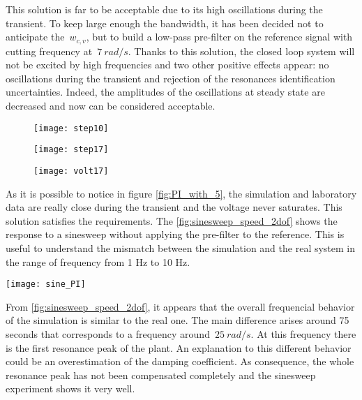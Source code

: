 This solution is far to be acceptable due to its high oscillations during the transient. To keep large enough the bandwidth, it has been decided not to anticipate the~$w_{c,v}$, but to build a low-pass pre-filter on the reference signal with cutting frequency at~$7\ rad/s$. Thanks to this solution, the closed loop system will not be excited by high frequencies and two other positive effects appear: no oscillations during the transient and rejection of the resonances identification uncertainties. Indeed, the amplitudes of the oscillations at steady state are decreased and now can be considered acceptable. 

\newpage
\begin{figure*}[h]
	\centering
\begin{subfigure}{0.4\columnwidth}
	\texttt{[image: step10]}
\end{subfigure}
\begin{subfigure}{0.4\columnwidth}
	\texttt{[image: step17]}
\end{subfigure}
\begin{subfigure}{0.4\columnwidth}
	\texttt{[image: volt17]}
\end{subfigure}
\caption{Speed control loop with $k_v=5$ with low-pass pre-filter}
\label{fig:PI_with_5}
\end{figure*}

As it is possible to notice in figure \ref{fig:PI_with_5}, the simulation and laboratory data are really close during the transient and the voltage never saturates. This solution satisfies the requirements. The \cref{fig:sinesweep_speed_2dof} shows the response to a sinesweep without applying the pre-filter to the reference.  This is useful to understand the mismatch between the simulation and the real system in the range of frequency from 1 Hz to 10 Hz.

\begin{figure*}[h]
	\centering
	\texttt{[image: sine\_PI]}
	\caption{Sineweep experiment from $1\ Hz$ to $10\ Hz$ in $100\ s$}
	\label{fig:sinesweep_speed_2dof}
\end{figure*}

From \cref{fig:sinesweep_speed_2dof}, it appears that the overall frequencial behavior of the simulation is similar to the real one. The main difference arises around 75 seconds that corresponds to a frequency around~$25\ rad/s$. At this frequency there is the first resonance peak of the plant. An explanation to this different behavior could be an overestimation of the damping coefficient. As consequence, the whole resonance peak has not been compensated completely and the sinesweep experiment shows it very well. \\

